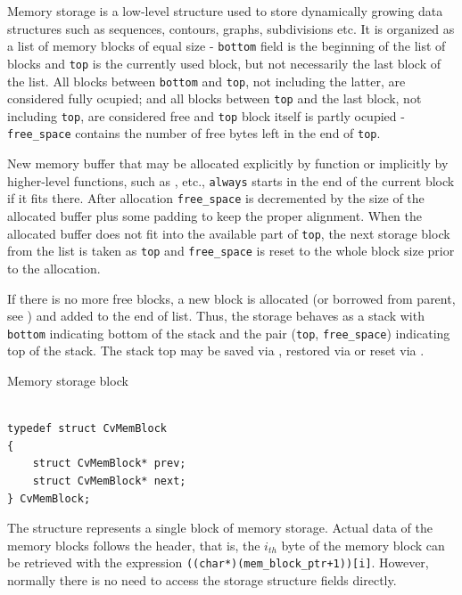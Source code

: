 Memory storage is a low-level structure used to store dynamically growing
data structures such as sequences, contours, graphs, subdivisions etc. It
is organized as a list of memory blocks of equal size - \texttt{bottom}
field is the beginning of the list of blocks and \texttt{top} is the
currently used block, but not necessarily the last block of the list. All
blocks between \texttt{bottom} and \texttt{top}, not including the
latter, are considered fully ocupied; and all blocks between \texttt{top}
and the last block, not including \texttt{top}, are considered free
and \texttt{top} block itself is partly ocupied - \texttt{free\_space}
contains the number of free bytes left in the end of \texttt{top}.

New memory buffer that may be allocated explicitly by
 function or implicitly by higher-level functions,
such as ,  etc., \texttt{always}
starts in the end of the current block if it fits there. After allocation
\texttt{free\_space} is decremented by the size of the allocated buffer
plus some padding to keep the proper alignment. When the allocated buffer
does not fit into the available part of \texttt{top}, the next storage
block from the list is taken as \texttt{top} and \texttt{free\_space}
is reset to the whole block size prior to the allocation.

If there is no more free blocks, a new block is allocated (or borrowed
from parent, see ) and added to the end of
list. Thus, the storage behaves as a stack with \texttt{bottom} indicating
bottom of the stack and the pair (\texttt{top}, \texttt{free\_space})
indicating top of the stack. The stack top may be saved via
, restored via 
or reset via .

\label{CvMemBlock}

Memory storage block

\begin{lstlisting}

typedef struct CvMemBlock
{
    struct CvMemBlock* prev;
    struct CvMemBlock* next;
} CvMemBlock;

\end{lstlisting}

The structure  represents a single block of memory
storage. Actual data of the memory blocks follows the header, that is,
the $i_{th}$ byte of the memory block can be retrieved with the expression
\texttt{((char*)(mem\_block\_ptr+1))[i]}. However, normally there is no need
to access the storage structure fields directly.


